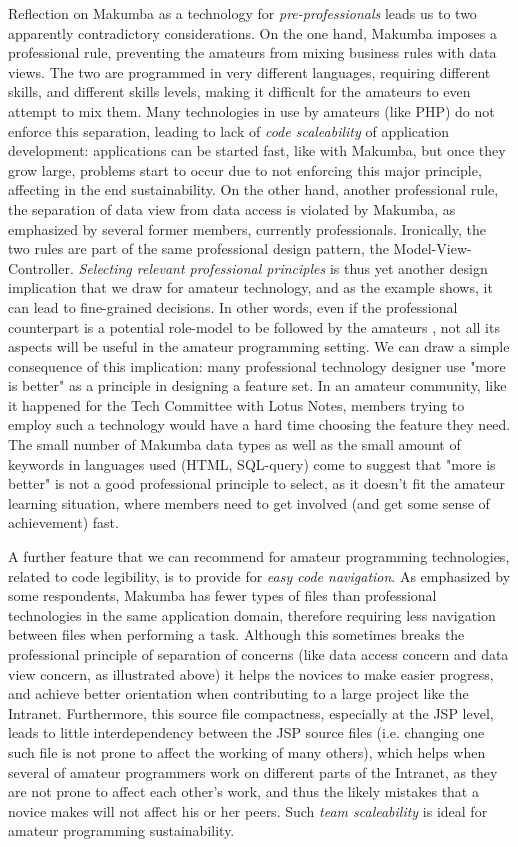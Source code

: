 \documentclass{acm_proc_article-sp}
\begin{document}
Reflection on Makumba as a technology for \textit{pre-professionals} \cite{stebbins79} leads us to two apparently contradictory considerations. On the one hand, Makumba imposes a professional rule, preventing the amateurs from mixing business rules with data views.  The two are programmed in very different languages, requiring different skills, and different skills levels, making  it difficult for the amateurs to even attempt to mix them. Many technologies in use by amateurs (like PHP) do not enforce this separation, leading to lack of \textit{code scaleability} of application development: applications can be started fast, like with Makumba, but once they grow large, problems start to occur due to not enforcing this major principle, affecting in the end sustainability. On the other hand, another professional rule, the separation of data view from data access is violated by Makumba, as emphasized by several former members, currently professionals. Ironically, the two rules are part of the same professional design pattern, the Model-View-Controller. \textit{Selecting relevant professional principles} is thus yet another design implication that we draw for amateur technology, and as the example shows, it can lead to fine-grained decisions. In other words, even if the professional counterpart is a potential role-model to be followed by the amateurs \cite{stebbins79}, not all its aspects will be useful in the amateur programming setting. We can draw a simple consequence of this implication: many professional technology designer use "more is better" as a principle in designing a feature set. In an amateur community, like it happened for the Tech Committee with Lotus Notes, members trying to employ such a technology would have a hard time choosing the feature they need. The small number of Makumba data types as well as the small amount of keywords in languages used (HTML, SQL-query) come to suggest that "more is better" is not a good professional principle to select, as it doesn't fit the amateur learning situation, where members need to get involved (and get some sense of achievement) fast. 

A further feature that we can recommend for amateur programming technologies, related to code legibility, is to provide for \textit{easy code navigation}.  As emphasized by some respondents, Makumba has fewer types of files than professional technologies in the same application domain, therefore requiring less navigation between files when performing a task. Although this sometimes breaks the professional principle of separation of concerns (like data access concern and data view concern, as illustrated above) it helps the novices to make easier progress, and achieve better orientation when contributing to a large project like the Intranet. Furthermore, this source file compactness, especially at the JSP level, leads to little interdependency between the JSP source files (i.e. changing one such file is not prone to affect the working of many others), which helps when several of amateur programmers work on different parts of the Intranet, as they are not prone to affect each other's work, and thus the likely mistakes that a novice makes will not affect his or her peers. Such \textit{team scaleability} is ideal for amateur programming sustainability.
\end{document}

